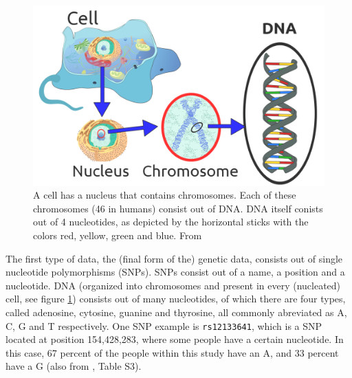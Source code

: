 \begin{figure}[!htbp]
  \centering
  \includegraphics[width=\linewidth]{1189px-Eukaryote_DNA-en.png}
  \caption{
    A cell has a nucleus that contains chromosomes. 
    Each of these chromosomes (46 in humans) consist out of DNA. 
    DNA itself conists out of 4 nucleotides, 
    as depicted by the horizontal sticks 
    with the colors red, yellow, green and blue.
    From \cite{sponk2012}
  }
  \label{fig:eukakyote_dna}
\end{figure}

The first type of data, the (final form of the) genetic data,
consists out of single nucleotide polymorphisms (SNPs).
SNPs consist out of a name, a position and a nucleotide. 
DNA (organized into chromosomes and present in every (nucleated) cell, 
see figure \ref{fig:eukakyote_dna}) consists out of many nucleotides, of which there are four types,
called adenosine, cytosine, guanine and thyrosine, all commonly abreviated
as A, C, G and T respectively.
One SNP example is \verb|rs12133641|, which is a SNP located at position 
154,428,283,
where some people have a certain nucleotide. In this case, 
67 percent of the people within this study have an A,
and 33 percent have a G (also from \cite{ahsan2017relative}, Table S3).


